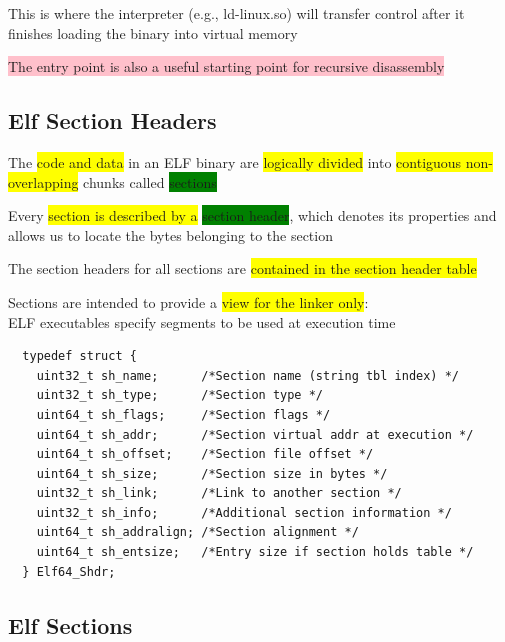 \documentclass[]{project_plan}
\begin{document}
This is where the interpreter (e.g., ld-linux.so) will transfer control after
it finishes loading the binary into virtual memory

\colorbox{pink}{The entry point is also a useful starting point for recursive disassembly}

\subsection{Elf Section Headers}

The \colorbox{yellow}{code and data} in an ELF binary are \colorbox{yellow}{logically divided} into \colorbox{yellow}{contiguous
  non-overlapping} chunks called \colorbox{green}{sections}

Every \colorbox{yellow}{section is described by a} \colorbox{green}{section header}, which denotes its properties
and allows us to locate the bytes belonging to the section

The section headers for all sections are \colorbox{yellow}{contained in the section header table}

Sections are intended to provide a \colorbox{yellow}{view for the linker only}:\\
ELF executables specify segments to be used at execution time

\begin{lstlisting}
  typedef struct {
    uint32_t sh_name;      /*Section name (string tbl index) */
    uint32_t sh_type;      /*Section type */
    uint64_t sh_flags;     /*Section flags */
    uint64_t sh_addr;      /*Section virtual addr at execution */
    uint64_t sh_offset;    /*Section file offset */
    uint64_t sh_size;      /*Section size in bytes */
    uint32_t sh_link;      /*Link to another section */
    uint32_t sh_info;      /*Additional section information */
    uint64_t sh_addralign; /*Section alignment */
    uint64_t sh_entsize;   /*Entry size if section holds table */
  } Elf64_Shdr;
\end{lstlisting}

\subsection{Elf Sections}
\end{document}
